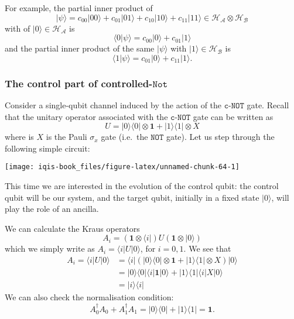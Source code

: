 \documentclass[fleqn]{article}
\begin{document}
For example, the partial inner product of
\[
  |\psi\rangle=c_{00}|00\rangle+c_{01}|01\rangle+c_{10}|10\rangle+c_{11}|11\rangle\in\mathcal{H}_{\mathcal{A}}\otimes\mathcal{H}_{\mathcal{B}}
\]
with of \(|0\rangle\in\mathcal{H}_{\mathcal{A}}\) is
\[
  \langle 0|\psi\rangle = c_{00}|0\rangle + c_{01}|1\rangle
\]
and the partial inner product of the same \(|\psi\rangle\) with \(|1\rangle\in\mathcal{H}_{\mathcal{B}}\) is
\[
  \langle 1|\psi\rangle = c_{01}|0\rangle + c_{11}|1\rangle.
\]

\hypertarget{control-controlled-NOT}{%
\subsubsection{\texorpdfstring{The control part of controlled-\(\texttt{Not}\)}{The control part of controlled-\textbackslash texttt\{Not\}}}\label{control-controlled-NOT}}

Consider a single-qubit channel induced by the action of the \(\texttt{c-NOT}\) gate.
Recall that the unitary operator associated with the \(\texttt{c-NOT}\) gate can be written as
\[
  U = |0\rangle\langle 0|\otimes\mathbf{1}+ |1\rangle\langle 1|\otimes X
\]
where is \(X\) is the Pauli \(\sigma_x\) gate (i.e.~the \(\texttt{NOT}\) gate).
Let us step through the following simple circuit:

\begin{center}\texttt{[image: iqis-book\_files/figure-latex/unnamed-chunk-64-1]} \end{center}

This time we are interested in the evolution of the control qubit: the control qubit will be our system, and the target qubit, initially in a fixed state \(|0\rangle\), will play the role of an ancilla.

We can calculate the Kraus operators
\[
  A_i = (\mathbf{1}\otimes\langle i|) U (\mathbf{1}\otimes|0\rangle)
\]
which we simply write as \(A_i=\langle i|U|0\rangle\), for \(i=0,1\).
We see that
\[
  \begin{aligned}
    A_i = \langle i|U|0\rangle
    &= \langle i| (|0\rangle\langle 0|\otimes\mathbf{1}+ |1\rangle\langle 1|\otimes X) |0\rangle
  \\&= |0\rangle\langle 0|\langle i|\mathbf{1}|0\rangle + |1\rangle\langle 1|\langle i|X|0\rangle
  \\&= |i\rangle\langle i|
\end{aligned}
\]
We can also check the normalisation condition:
\[
  A_0^\dagger A_0 + A_1^\dagger A_1
  = |0\rangle\langle 0| + |1\rangle\langle 1|
  =\mathbf{1}.
\]
\end{document}
